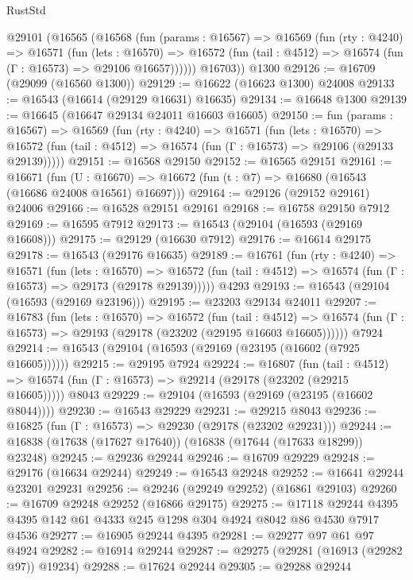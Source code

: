 \begin{lexlean}{RustStd}
\begin{coremodule}
    @29101
      (@16565
        (@16568
          (fun (params : @16567) =>
          @16569
            (fun (rty : @4240) =>
            @16571
              (fun (lets : @16570) =>
              @16572 (fun (tail : @4512) => @16574 (fun (Γ : @16573) => @29106 @16657))))))
        @16703))
    @1300
@29126 := @16709 (@29099 (@16560 @1300))
@29129 := @16622 (@16623 @1300) @24008
@29133 := @16543 (@16614 (@29129 @16631) @16635)
@29134 := @16648 @1300
@29139 := @16645 (@16647 @29134 @24011 @16603 @16605)
@29150 := fun (params : @16567) =>
  @16569
    (fun (rty : @4240) =>
    @16571
      (fun (lets : @16570) =>
      @16572 (fun (tail : @4512) => @16574 (fun (Γ : @16573) => @29106 (@29133 @29139)))))
@29151 := @16568 @29150
@29152 := @16565 @29151
@29161 := @16671
    (fun (U : @16670) => @16672 (fun (t : @7) => @16680 (@16543 (@16686 @24008 @16561) @16697)))
@29164 := @29126 (@29152 @29161) @24006
@29166 := @16528 @29151 @29161
@29168 := @16758 @29150 @7912
@29169 := @16595 @7912
@29173 := @16543 (@29104 (@16593 (@29169 @16608)))
@29175 := @29129 (@16630 @7912)
@29176 := @16614 @29175
@29178 := @16543 (@29176 @16635)
@29189 := @16761
    (fun (rty : @4240) =>
    @16571
      (fun (lets : @16570) =>
      @16572 (fun (tail : @4512) => @16574 (fun (Γ : @16573) => @29173 (@29178 @29139)))))
    @4293
@29193 := @16543 (@29104 (@16593 (@29169 @23196)))
@29195 := @23203 @29134 @24011
@29207 := @16783
    (fun (lets : @16570) =>
    @16572
      (fun (tail : @4512) =>
      @16574 (fun (Γ : @16573) => @29193 (@29178 (@23202 (@29195 @16603 @16605))))))
    @7924
@29214 := @16543 (@29104 (@16593 (@29169 (@23195 (@16602 (@7925 @16605))))))
@29215 := @29195 @7924
@29224 := @16807
    (fun (tail : @4512) => @16574 (fun (Γ : @16573) => @29214 (@29178 (@23202 (@29215 @16605)))))
    @8043
@29229 := @29104 (@16593 (@29169 (@23195 (@16602 @8044))))
@29230 := @16543 @29229
@29231 := @29215 @8043
@29236 := @16825 (fun (Γ : @16573) => @29230 (@29178 (@23202 @29231)))
@29244 := @16838 (@17638 (@17627 @17640)) (@16838 (@17644 (@17633 @18299)) @23248)
@29245 := @29236 @29244
@29246 := @16709 @29229
@29248 := @29176 (@16634 @29244)
@29249 := @16543 @29248
@29252 := @16641 @29244 @23201 @29231
@29256 := @29246 (@29249 @29252) (@16861 @29103)
@29260 := @16709 @29248 @29252 (@16866 @29175)
@29275 := @17118 @29244 @4395 @4395 @142 @61 @4333 @245 @1298 @304 @4924 @8042 @86 @4530 @7917 @4536
@29277 := @16905 @29244 @4395
@29281 := @29277 @97 @61 @97 @4924
@29282 := @16914 @29244
@29287 := @29275 (@29281 (@16913 (@29282 @97)) @19234)
@29288 := @17624 @29244
@29305 := @29288
    @29244

\end{coremodule}
\end{lexlean}
